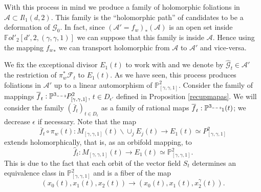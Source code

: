 \documentclass{amsart}
\theoremstyle{definition}
\theoremstyle{proposition}
\numberwithin{equation}{section}
\theoremstyle{main}
\begin{document}
 With this process in mind we produce a family of holomorphic foliations in $\mathcal A\subset Il_{1}(d,2)$. This family is the ``holomorphic path'' of candidates to be a deformation of $\mathcal G_{0}$. In fact, since $(\mathcal {A}'={f_w})_*{(\mathcal A)}$  is an open set inside $ \mathbb{F}ol'_{2}[d',2,(\gamma,\gamma,1)]$ we can suppose that this family is inside $\mathcal A$. Hence using the mapping ${f_w}_*$ we can transport holomorphic from $\mathcal A$ to $\mathcal {A}'$ and vice-versa.
 

We fix the exceptional divisor $E_1(t)$ to work with and we denote by $\hat {\mathcal{G}}_t \in \mathcal {A}'$ the restriction of $\pi_w^*\mathcal{F}_t$ to $E_1(t)$. As we have seen, this process produces foliations in $\mathcal A'$ up to a linear automorphism of $\mathbb P_{[\gamma,\gamma,1]}^2$. Consider the family of mappings $\overline{f}_{t}:\mathbb P^{3} {\mathbin{\tikz [baseline=-0.25ex,-latex, dashed,->,densely dashed    ] \draw [->,densely dashed    ] (0pt,
0.5ex) -- (1.3em,0.5ex);}} P_{[\gamma,\gamma,1]}^2$, ${t \in D_{\epsilon'}}$ defined in Proposition \ref{recupmapas}. We will consider the family $(\overline{f}_{t})_{t\in D_{\epsilon}}$ as a family of rational maps  $\overline{f}_{t}:\mathbb P^3  {\mathbin{\tikz [baseline=-0.25ex,-latex, dashed,->,densely dashed    ] \draw [->,densely dashed    ] (0pt,
0.5ex) -- (1.3em,0.5ex);}}_{1}(t)$; we decrease $\epsilon$ if necessary. Note that the map $$\overline{f}_{t}\circ \pi_{w}(t):M_{[\gamma,\gamma,1]}(t) \backslash \cup_{j} E_{j}(t) \to E_{1}(t) \simeq P_{[\gamma,\gamma,1]}^2$$ extends holomorphically, that is, as an orbifold mapping, to 
$$\hat{f}_{t}:M_{[\gamma,\gamma,1]}(t) \to   E_{1}(t)\simeq \mathbb P_{[\gamma,\gamma,1]}^2.$$
This is due to the fact that each orbit of the vector field $S_t$ determines an equivalence class in $\mathbb P_{[\gamma,\gamma,1]}^2$ and is a fiber of the map $$(x_{0}(t),x_{1}(t),x_{2}(t))\to(x_{0}(t), x_{1}(t),x_{2}^\gamma(t)).$$
\end{document}

